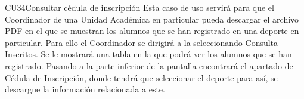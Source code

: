 \begin{UseCase}{CU34}{Consultar cédula de inscripción}{
		\noindent Esta caso de uso servirá para que el Coordinador de una Unidad Académica en particular pueda descargar el archivo PDF en el que se muestran los alumnos que se han registrado en una deporte en particular.
		Para ello el Coordinador se dirigirá a la  seleccionando Consulta Inscritos. Se le mostrará una tabla en la que podrá ver los alumnos que se han registrado. Pasando a la parte inferior de la pantalla encontrará el apartado de Cédula de Inscripción, donde tendrá que seleccionar el deporte para así, se descargue la información relacionada a este.
	} \label{CU34_evento}

		\end{UseCase}
	

